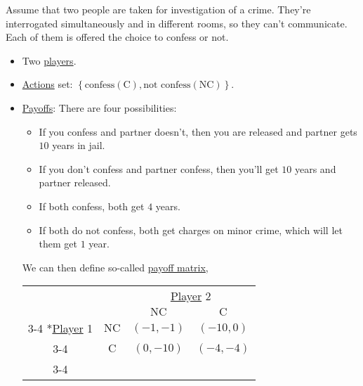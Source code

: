 \begin{eg}\label{eg:prisoner-dilemma}
	Assume that two people are taken for investigation of a crime. They're interrogated simultaneously and in different rooms, so
	they can't communicate. Each of them is offered the choice to confess or not.
	\begin{itemize}
		\item Two \hyperref[def:player]{players}.
		\item \hyperref[def:strategy]{Actions} set: \(\left\{\text{confess} (\mathrm{C}), \text{not confess} (\mathrm{NC})\right\}\).
		\item \hyperref[def:reward]{Payoffs}: There are four possibilities:
		      \begin{itemize}
			      \item If you confess and partner doesn't, then you are released and partner gets \(10\) years in jail.
			      \item If you don't confess and partner confess, then you'll get \(10\) years and partner released.
			      \item If both confess, both get \(4\) years.
			      \item If both do not confess, both get charges on minor crime, which will let them get \(1\) year.
		      \end{itemize}
		      We can then define so-called \hyperref[def:payoff-matrix]{payoff matrix},
		      \begin{table}[H]
			      \centering
			      \setlength{\extrarowheight}{2pt}
			      \begin{tabular}{cc|c|c|}
				                                                     & \multicolumn{1}{c}{} & \multicolumn{2}{c}{\hyperref[def:player]{Player} 2}                                    \\
				                                                     & \multicolumn{1}{c}{} & \multicolumn{1}{c}{$\mathrm{NC}$}                   & \multicolumn{1}{c}{$\mathrm{C}$} \\\cline{3-4}
				      \multirow{2}*{\hyperref[def:player]{Player} 1} & $\mathrm{NC}$        & $(-1, -1)$                                          & $(-10, 0)$                       \\\cline{3-4}
				                                                     & $\mathrm{C}$         & $(0, -10)$                                          & $(-4, -4)$                       \\\cline{3-4}
			      \end{tabular}

\end{table}
\end{itemize}
\end{eg}
